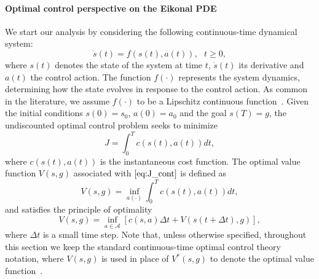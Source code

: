 \documentclass{article}
\theoremstyle{plain}
\theoremstyle{definition}
\theoremstyle{remark}
\begin{document}
\vspace{-0.0cm}
\paragraph{Optimal control perspective on the Eikonal PDE} We start our analysis by considering the following continuous-time dynamical system:
\begin{equation*}
    \dot{s}(t) = f(s(t), a(t)), \ \ \ t \geq 0,
\end{equation*}
where $s(t)$ denotes the state of the system at time $t$, $\dot{s}(t)$ its derivative and $a(t)$ the control action. The function $f(\cdot)$ represents the system dynamics, determining how the state evolves in response to the control action. As common in the literature, we assume $f(\cdot)$ to be a Lipschitz continuous function~\cite{kim2021hamilton}. Given the initial conditions $s(0) = s_0$, $a(0) = a_0$ and the goal $s(T) = g$, the undiscounted optimal control problem seeks to minimize 
\begin{equation}
    J = \int_0^T c(s(t), a(t))dt, 
    \label{eq:J_cont}
\end{equation}
where $c(s(t), a(t))$ is the instantaneous cost function. The optimal value function $V(s,g)$ associated with $\eqref{eq:J_cont}$ is defined as
\begin{equation*}
    V(s, g) = \inf_{a(\cdot)} \int_0^T c(s(t), a(t))dt, 
\end{equation*}
and satisfies the principle of optimality
\begin{equation}
V(s, g) = \inf_{a \in \mathcal{A}}[c(s, a)\Delta t + V(s(t+\Delta t), g)], 
\label{eq:principle_of_optimality}
\end{equation}
where $\Delta t$ is a small time step. Note that, unless otherwise specified, throughout this section we keep the standard continuous-time optimal control theory notation, where $V(s,g)$ is used in place of $V^*(s,g)$ to denote the optimal value function~\cite{fleming2006controlled}.
\end{document}
